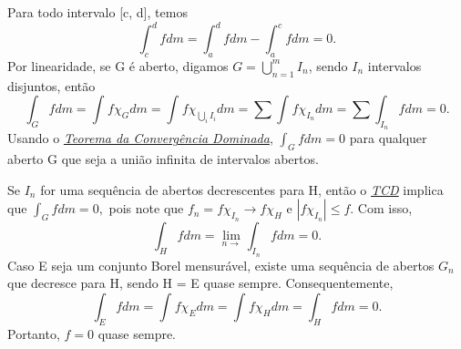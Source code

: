 \documentclass[MeasureTheory/measure_theory.tex]{subfiles}
\begin{document}
\begin{proof*}
	Para todo intervalo [c, d], temos
	\[
		\int_{c}^{d}f dm = \int_{a}^{d} fdm - \int_{a}^{c} fdm = 0.
	\]
	Por linearidade, se G é aberto, digamos \(G = \bigcup_{n=1}^{m}I_{n}\), sendo \(I_{n}\) intervalos disjuntos, então
	\[
		\int_{G}f dm = \int_{}f \chi_{G} dm = \int_{}f \chi_{\bigcup_{i}^{}I_{i}} dm = \sum\limits_{}^{}\int_{}f \chi_{I_{n}} dm = \sum\limits_{}^{}\int_{I_{n}}f dm = 0.
	\]
	Usando o \hyperlink{dominated_convergence}{\textit{Teorema da Convergência Dominada}}, \(\int_{G}f dm = 0\) para qualquer aberto G que seja a união infinita de intervalos abertos.

	Se \(I_{n}\) for uma sequência de abertos decrescentes para H, então o \hyperlink{dominated_convergence}{\textit{TCD}} implica que \(\int_{G}f dm = 0,\) pois note que
	\(f_{n} = f \chi_{I_{n}}\to f \chi_{H}\) e \(|f \chi_{I_{n}}| \leq f.\) Com isso,
	\[
		\int_{H}f dm = \lim_{n\to } \int_{I_{n}}f dm = 0.
	\]
	Caso E seja um conjunto Borel mensurável, existe uma sequência de abertos \(G_{n}\) que decresce para H, sendo H = E quase sempre. Consequentemente,
	\[
		\int_{E}f dm = \int_{}^{}f \chi_{E} dm = \int_{}f \chi_{H} dm = \int_{H}f dm = 0.
	\]
	Portanto, \(f = 0\) quase sempre. \qedsymbol
\end{proof*}
\end{document}
